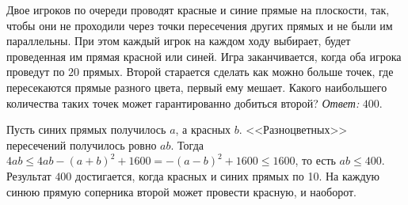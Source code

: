 \problem
Двое игроков по очереди проводят красные и синие прямые на плоскости, так,
чтобы они не проходили через точки пересечения других прямых и не были им
параллельны.
При этом каждый игрок на каждом ходу выбирает, будет проведенная им прямая
красной или синей.
Игра заканчивается, когда оба игрока проведут по $20$ прямых.
Второй старается сделать как можно больше точек, где пересекаются прямые
разного цвета, первый ему мешает.
Какого наибольшего количества таких точек может гарантированно добиться второй?
\solution
\emph{Ответ:} $400$.
\par
Пусть синих прямых получилось $a$, а красных $b$.
<<Разноцветных>> пересечений получилось ровно $a b$.
Тогда
\(
    4 a b
\leq
    4 a b - (a + b)^2 + 1600
=
    -(a - b)^2 + 1600
\leq
    1600
\),
то есть $a b \leq 400$.
Результат $400$ достигается, когда красных и синих прямых по 10.
На каждую синюю прямую соперника второй может провести красную, и наоборот.
\endproblem
